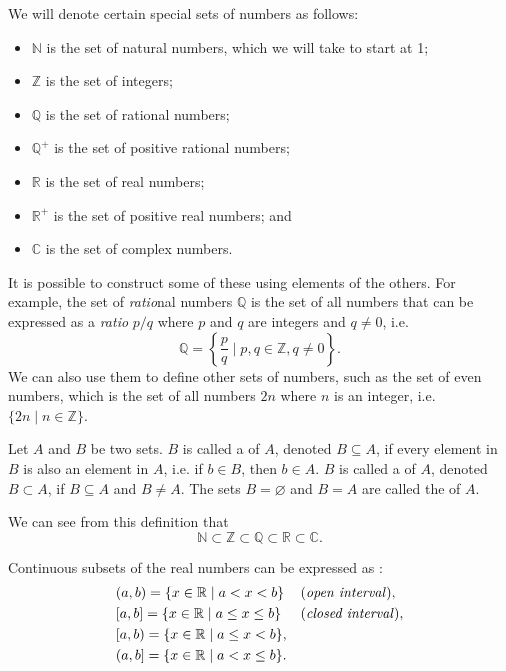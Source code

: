 We will denote certain special sets of numbers as follows:
\begin{itemize}
    \item $ \mathbb{N} $ is the set of natural numbers, which we will take to start at 1;
    \item $ \mathbb{Z} $ is the set of integers;
    \item $ \mathbb{Q} $ is the set of rational numbers;
    \item $ \mathbb{Q}^+ $ is the set of positive rational numbers;
    \item $ \mathbb{R} $ is the set of real numbers;
    \item $ \mathbb{R}^+ $ is the set of positive real numbers; and
    \item $ \mathbb{C} $ is the set of complex numbers.
\end{itemize}

It is possible to construct some of these using elements of the others. For example, the set of \emph{ratio}nal numbers $ \mathbb{Q} $ is the set of all numbers that can be expressed as a \emph{ratio} $ p/q $ where $ p $ and $ q $ are integers and $ q\neq 0 $, i.e.
\begin{equation*}
    \mathbb{Q}=\left\{\frac{p}{q}\mid p,q\in\mathbb{Z},q\neq 0\right\}.
\end{equation*}
We can also use them to define other sets of numbers, such as the set of even numbers, which is the set of all numbers $ 2n $ where $ n $ is an integer, i.e. $ \{2n\mid n\in\mathbb{Z}\} $.

\begin{definition}
Let $ A $ and $ B $ be two sets. $ B $ is called a  of $ A $, denoted $ B\subseteq A $, if every element in $ B $ is also an element in $ A $, i.e. if $ b\in B $, then $ b\in A $. $ B $ is called a  of $ A $, denoted $ B\subset A $, if $ B\subseteq A $ and $ B\neq A $. The sets $ B=\varnothing $ and $ B=A $ are called the  of $ A $.
\end{definition}

We can see from this definition that
\begin{equation*}
    \mathbb{N}\subset\mathbb{Z}\subset\mathbb{Q}\subset\mathbb{R}\subset\mathbb{C}.
\end{equation*}

Continuous subsets of the real numbers can be expressed as :
\begin{align*}
    & (a,b)=\{x\in\mathbb{R}\mid a<x<b\} && \text{(\emph{open interval})}, \\
    & [a,b]=\{x\in\mathbb{R}\mid a\leq x\leq b\} &&\text{(\emph{closed interval})}, \\
    & [a,b)=\{x\in\mathbb{R}\mid a\leq x<b \}, \\
    & (a,b]=\{x\in\mathbb{R}\mid a<x\leq b\}.
\end{align*}

